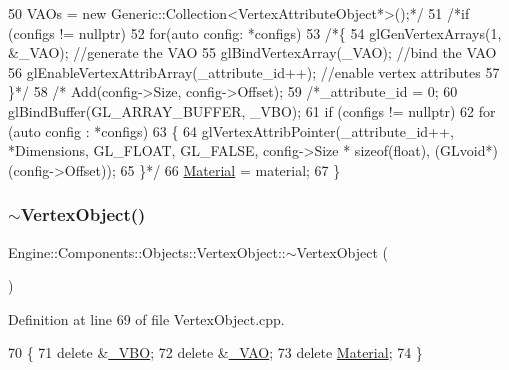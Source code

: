 \begin{DoxyCode}
50 \textcolor{comment}{    VAOs = new Generic::Collection<VertexAttributeObject*>();*/}
51     \textcolor{comment}{/*if (configs != nullptr)}
52 \textcolor{comment}{        for(auto config: *configs)}
53 \textcolor{comment}{        /*\{}
54 \textcolor{comment}{            glGenVertexArrays(1, &\_VAO); //generate the VAO}
55 \textcolor{comment}{            glBindVertexArray(\_VAO); //bind the VAO}
56 \textcolor{comment}{            glEnableVertexAttribArray(\_attribute\_id++); //enable vertex attributes}
57 \textcolor{comment}{        \}*/}
58         \textcolor{comment}{/*  Add(config->Size, config->Offset);}
59 \textcolor{comment}{    /*\_attribute\_id = 0;}
60 \textcolor{comment}{    glBindBuffer(GL\_ARRAY\_BUFFER, \_VBO);}
61 \textcolor{comment}{    if (configs != nullptr)}
62 \textcolor{comment}{        for (auto config : *configs)}
63 \textcolor{comment}{        \{}
64 \textcolor{comment}{            glVertexAttribPointer(\_attribute\_id++, *Dimensions, GL\_FLOAT, GL\_FALSE, config->Size *
       sizeof(float), (GLvoid*)(config->Offset));}
65 \textcolor{comment}{        \}*/}
66     \mbox{\hyperlink{classEngine_1_1Components_1_1Objects_1_1VertexObject_a86c1fced4cdc5e59a66a635390a17eca}{Material}} = material;
67 \}
\end{DoxyCode}
\mbox{\label{classEngine_1_1Components_1_1Objects_1_1VertexObject_a90ab6da3110fffb6343790de9ba5b0de}} 
\subsubsection{\texorpdfstring{$\sim$\+Vertex\+Object()}{~VertexObject()}}
{\footnotesize\ttfamily Engine\+::\+Components\+::\+Objects\+::\+Vertex\+Object\+::$\sim$\+Vertex\+Object (\begin{DoxyParamCaption}{ }\end{DoxyParamCaption})}



Definition at line 69 of file Vertex\+Object.\+cpp.


\begin{DoxyCode}
70 \{
71     \textcolor{keyword}{delete} &\mbox{\hyperlink{classEngine_1_1Components_1_1Objects_1_1VertexObject_a79e171ffe4b9342d76c0c729a9836fd2}{\_VBO}};
72     \textcolor{keyword}{delete} &\mbox{\hyperlink{classEngine_1_1Components_1_1Objects_1_1VertexObject_ae85ac9d5ded8f54d58feb7fb78e75130}{\_VAO}};
73     \textcolor{keyword}{delete} \mbox{\hyperlink{classEngine_1_1Components_1_1Objects_1_1VertexObject_a86c1fced4cdc5e59a66a635390a17eca}{Material}};
74 \}
\end{DoxyCode}


